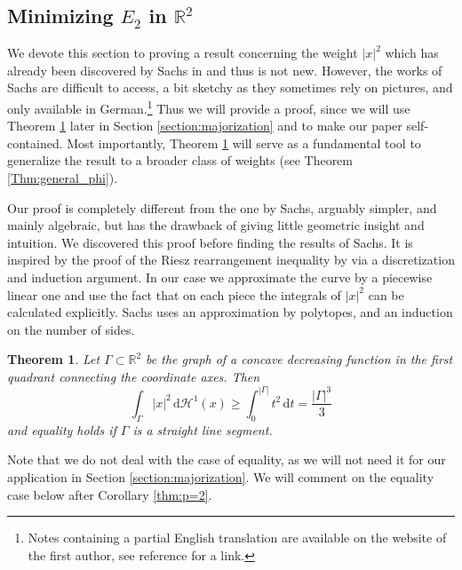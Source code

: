 \documentclass[10pt,leqno]{amsart}
\newcommand{\R}[0]{\mathbb{R}}
\newcommand{\dd}{\, \mathrm{d}}
\newcommand{\dHo}{\, \mathrm{d} \mathcal{H}^{1}}
\newtheorem{Theorem}{Theorem}
\numberwithin{Theorem}{section}
\theoremstyle{definition}
\theoremstyle{remark}
\numberwithin{equation}{section}
\numberwithin{equation}{section}
\begin{document}
\subsection{Minimizing $E_{2}$ in $\R^2$}
\label{section:p=2}

We devote this section to proving a result concerning the weight $|x|^2$ which has already been discovered by Sachs in  \cite{SachsIandII} and thus is not new. However,  the works of Sachs are difficult to access,  a bit sketchy as they sometimes rely on pictures, and only available in German.\footnote{Notes containing a partial English translation are available on the website of the first author, see reference \cite{SachsIandII} for a link.} Thus we will provide a proof, since we will use Theorem \ref{lm:quad_lemma_p=2} later in Section \ref{section:majorization} and to make our paper self-contained.  Most importantly, Theorem \ref{lm:quad_lemma_p=2} will serve as a fundamental tool to generalize the result to a broader class of weights (see Theorem \ref{Thm:general_phi}).


Our proof is completely different from the one by Sachs, arguably simpler, and mainly algebraic, but has the drawback of giving little geometric insight and intuition. We discovered this proof before finding the results of Sachs. It is inspired by the proof of the Riesz rearrangement inequality by \cite{hardy1952inequalities} via a discretization and induction argument. In our case we approximate the curve by a piecewise linear one and use the fact that on each piece the integrals of $|x|^2$ can be calculated explicitly. Sachs \cite{SachsIandII} uses an approximation  by polytopes, and an induction on the number of sides. 

\begin{Theorem} \label{lm:quad_lemma_p=2}
Let $\Gamma \subset \R^2$ be the graph of a concave decreasing function in the first quadrant connecting the coordinate axes. Then
\begin{equation} \label{ineq:conj2}
 \int_{\Gamma} |x|^2 \dHo(x) \geq \int_{0}^{|\Gamma|} t^2  \dd t =    \frac{|\Gamma|^3}{3}
\end{equation}
and equality holds if $\Gamma$ is a straight line segment. 
\end{Theorem}

Note that we do not deal with the case of equality, as we will not need it for our application in Section \ref{section:majorization}. We will comment on the equality case below after Corollary \ref{thm:p=2}. 
\end{document}

